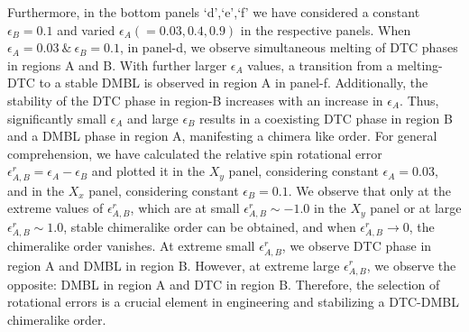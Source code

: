 \documentclass[12pt]{iopart}
\begin{document}
Furthermore, in the bottom panels `d',`e',`f' we have considered a constant $\epsilon_{B} = 0.1$ and varied $\epsilon_{A}(=0.03,0.4,0.9)$ in the respective panels. When $\epsilon_{A}=0.03~\&~ \epsilon_{B}=0.1$, in panel-d, we observe simultaneous melting of DTC phases in regions A and B. With further larger $\epsilon_{A}$ values, a transition from a melting-DTC to a stable DMBL is observed in region A in panel-f. Additionally, the stability of the DTC phase in region-B increases with an increase in $\epsilon_{A}$. Thus, significantly small $\epsilon_{A}$ and large $\epsilon_{B}$ results in a coexisting DTC phase in region B and a DMBL phase in region A, manifesting a chimera like order. For general comprehension, we have calculated the relative spin rotational error $\epsilon^r_{A,B} = \epsilon_{A}-\epsilon_{B}$ and plotted it in the $X_y$ panel, considering constant $\epsilon_{A} = 0.03$, and in the $X_x$ panel, considering constant $\epsilon_{B} = 0.1$. We observe that only at the extreme values of $\epsilon^r_{A,B}$, which are at small $\epsilon^r_{A,B} \sim -1.0$ in the $X_y$ panel or at large $\epsilon^r_{A,B} \sim 1.0$, stable chimeralike order can be obtained, and when $\epsilon^r_{A,B}\rightarrow 0$, the chimeralike order vanishes.
At extreme small $\epsilon^r_{A,B}$, we observe DTC phase in region A and DMBL in region B. However, at extreme large $\epsilon^r_{A,B}$, we observe the opposite: DMBL in region A and DTC in region B. Therefore, the selection of rotational errors is a crucial element in engineering and stabilizing a DTC-DMBL chimeralike order.
\end{document}
